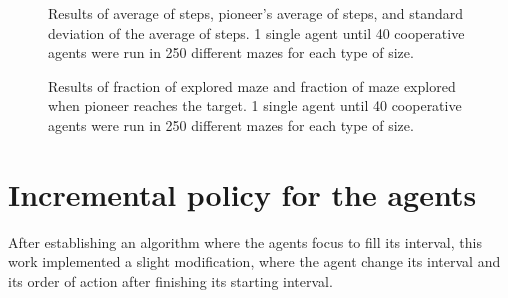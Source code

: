\begin{figure}
    \centering
    \qquad
    \qquad
    \newline
    \qquad
    \caption{Results of average of steps, pioneer's average of steps, and standard deviation of the average of steps. 1 single agent until 40 cooperative agents were run in 250 different mazes for each type of size.}
    \label{our_algorithm_steps}
\end{figure}

\begin{figure}
    \centering
    \qquad
    \qquad
    \newline
    \qquad
    \caption{Results of fraction of explored maze and fraction of maze explored when pioneer reaches the target. 1 single agent until 40 cooperative agents were run in 250 different mazes for each type of size.}
    \label{our_algorithm_fraction}
\end{figure}


\section{Incremental policy for the agents}
\label{section_results_incremental_policy}

After establishing an algorithm where the agents focus to fill its interval, this work implemented a slight modification, where the agent change its interval and its order of action after finishing its starting interval.

